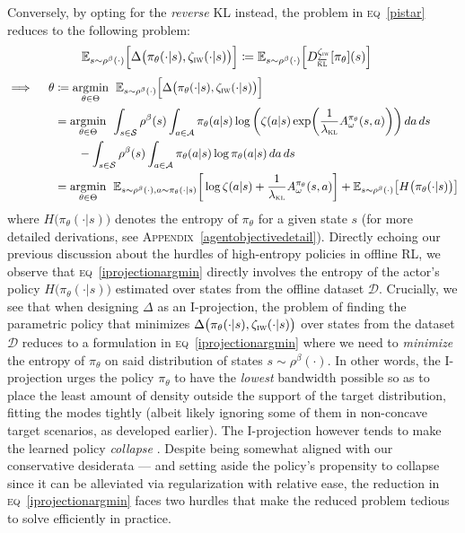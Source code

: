 Conversely, by opting for the \emph{reverse} KL instead, the problem in \textsc{eq}~\ref{pistar}
reduces to the following problem:
\begin{align}
  \mathbb{E}_{s \sim \rho^\beta(\cdot)}
  \Big[
  \Delta\big(\pi_\theta(\cdot | s), \zeta_\textsc{iw}(\cdot | s)\big)
  \Big]
  &\coloneqq
  \mathbb{E}_{s \sim \rho^\beta(\cdot)}
  \Big[
  D^{\zeta_\textsc{iw}}_{\overleftarrow{\textsc{kl}}}[\pi_\theta](s)
  \Big]
  \label{iprojection}
\end{align}
\begin{align}
  \implies \quad
  \theta &\coloneqq
  \operatorname*{\arg\!\min}_{\theta \in \Theta} \;\,
  \mathbb{E}_{s \sim \rho^\beta(\cdot)}
  \Big[
  \Delta\big(\pi_\theta(\cdot | s), \zeta_\textsc{iw}(\cdot | s)\big)
  \Big]
  \\
  &= \operatorname*{\arg\!\min}_{\theta \in \Theta} \;\,
  \int_{s \in \mathcal{S}} \rho^\beta(s) \int_{a \in \mathcal{A}}
  \pi_\theta(a | s)
  \log \bigg(\zeta(a | s) \exp (\frac{1}{\lambda_\textsc{kl}} A^{\pi_\theta}_\omega(s,a))\bigg) \, da \, ds
  \nonumber \\
  & \qquad -
  \int_{s \in \mathcal{S}} \rho^\beta(s) \int_{a \in \mathcal{A}} \pi_\theta(a | s)
  \log \pi_\theta(a | s) \, da \, ds
  \\
  &= \operatorname*{\arg\!\min}_{\theta \in \Theta} \;\,
  \mathbb{E}_{s \sim \rho^\beta(\cdot), a \sim \pi_\theta(\cdot | s)}
  \bigg[
  \log \zeta(a | s) + \frac{1}{\lambda_\textsc{kl}} A^{\pi_\theta}_\omega(s,a)
  \bigg]
  + \mathbb{E}_{s \sim \rho^\beta(\cdot)} \big[H\big(\pi_\theta(\cdot | s)\big)\big]
  \label{iprojectionargmin}
\end{align}
where $H\big(\pi_\theta(\cdot | s)\big)$ denotes the entropy of $\pi_\theta$ for a given state $s$
(for more detailed derivations, see
\textsc{Appendix}~\ref{agentobjectivedetail}).
Directly echoing our previous discussion about the hurdles of high-entropy policies in offline RL,
we observe that \textsc{eq}~\ref{iprojectionargmin} directly involves the entropy of the actor's policy
$H\big(\pi_\theta(\cdot | s)\big)$ estimated over states from the offline dataset $\mathcal{D}$.
Crucially, we see that when designing $\Delta$ as an I-projection, the problem of finding the parametric
policy that minimizes $\Delta\big(\pi_\theta(\cdot | s), \zeta_\textsc{iw}(\cdot | s)\big)$
over states from the dataset $\mathcal{D}$ reduces to a formulation in \textsc{eq}~\ref{iprojectionargmin}
where we need to \emph{minimize} the entropy of $\pi_\theta$ on said distribution of states $s \sim \rho^\beta(\cdot)$.
In other words, the I-projection urges the policy $\pi_\theta$ to have the \emph{lowest} bandwidth possible
so as to place the least amount of density outside the support of the target distribution,
fitting the modes tightly (albeit likely ignoring some of them in non-concave target scenarios, as developed earlier).
The I-projection however tends to make the learned policy \emph{collapse} \cite{Abdolmaleki2018-sp}.
Despite being somewhat aligned with our conservative desiderata
--- and setting aside the policy's propensity to collapse since it can be alleviated via regularization
with relative ease,
the reduction in \textsc{eq}~\ref{iprojectionargmin} faces two hurdles
that make the reduced problem tedious to solve efficiently in practice.

